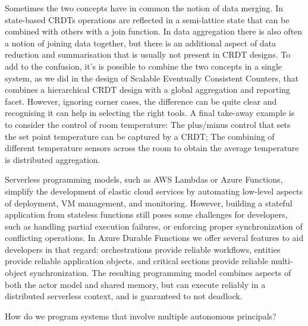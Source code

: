 \documentclass[a4paper,UKenglish]{dagrep-v2018}
\begin{document}
Sometimes the two concepts have in common the notion of data merging. In state-based CRDTs operations are reflected in a semi-lattice state that can be combined with others with a join function. In data aggregation there is also often a notion of joining data together, but there is an additional aspect of data reduction and summarisation that is usually not present in CRDT designs. To add to the confusion, it’s is possible to combine the two concepts in a single system, as we did in the design of Scalable Eventually Consistent Counters, that combines a hierarchical CRDT design with a global aggregation and reporting facet.
However, ignoring corner cases, the difference can be quite clear and recognising it can help in selecting the right tools. A final take-away example is to consider the control of room temperature: The plus/minus control that sets the set point temperature can be captured by a CRDT; The combining of different temperature sensors across the room to obtain the average temperature is distributed aggregation.


\license

Serverless programming models, such as AWS Lambdas or Azure Functions, simplify the development of elastic cloud services by automating low-level aspects of deployment, VM management, and monitoring. However, building a stateful application from stateless functions still poses some challenges for developers, such as handling partial execution failures, or enforcing proper synchronization of conflicting operations. In Azure Durable Functions we offer several features to aid developers in that regard: orchestrations provide reliable workflows, entities provide reliable application objects, and critical sections provide reliable multi-object synchronization. The resulting programming model combines aspects of both the actor model and shared memory, but can execute reliably in a distributed serverless context, and is guaranteed to not deadlock.


\license

How do we program systems that involve multiple autonomous principals?
\end{document}
